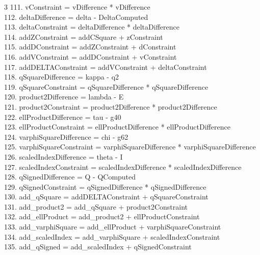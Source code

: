 \documentclass[10pt]{article}
\begin{document}
\begin{multicols}{3}
111. vConstraint = vDifference * vDifference\\
112. deltaDifference = delta - DeltaComputed\\
113. deltaConstraint = deltaDifference * deltaDifference\\
114. addZConstraint = addCSquare + zConstraint\\
115. addDConstraint = addZConstraint + dConstraint\\
116. addVConstraint = addDConstraint + vConstraint\\
117. addDELTAConstraint = addVConstraint + deltaConstraint\\
118. qSquareDifference = kappa - q2\\
119. qSquareConstraint = qSquareDifference * qSquareDifference\\
120. product2Difference = lambda - E\\
121. product2Constraint = product2Difference * product2Difference\\
122. ellProductDifference = tau - g40\\
123. ellProductConstraint = ellProductDifference * ellProductDifference\\
124. varphiSquareDifference = chi - g62\\
125. varphiSquareConstraint = varphiSquareDifference * varphiSquareDifference\\
126. scaledIndexDifference = theta - I\\
127. scaledIndexConstraint = scaledIndexDifference * scaledIndexDifference\\
128. qSignedDifference = Q - QComputed\\
129. qSignedConstraint = qSignedDifference * qSignedDifference\\
130. add\_qSquare = addDELTAConstraint + qSquareConstraint\\
131. add\_product2 = add\_qSquare + product2Constraint\\
132. add\_ellProduct = add\_product2 + ellProductConstraint\\
133. add\_varphiSquare = add\_ellProduct + varphiSquareConstraint\\
134. add\_scaledIndex = add\_varphiSquare + scaledIndexConstraint\\
135. add\_qSigned = add\_scaledIndex + qSignedConstraint\\
\end{multicols}
\end{document}
